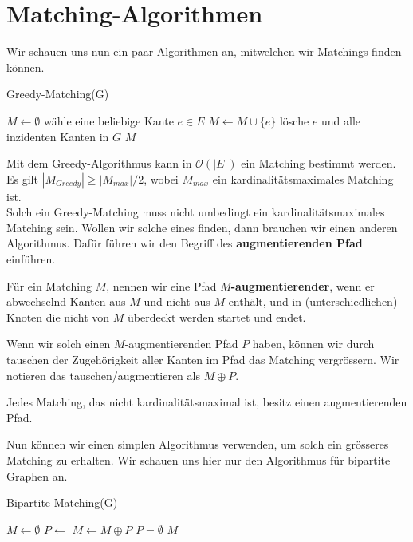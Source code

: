 \section{Matching-Algorithmen}

Wir schauen uns nun ein paar Algorithmen an, mitwelchen wir Matchings finden können.

\begin{algorithm}
    \caption{Greedy-Matching(G)}
    \begin{algorithmic}[1]
        \State $M \leftarrow \emptyset$
            \State wähle eine beliebige Kante $e \in E$
            \State $ M \leftarrow M \cup \{e\}$
            \State lösche $e$ und alle inzidenten Kanten in $G$
        \EndWhile
        \State \Return $M$
    \end{algorithmic}
\end{algorithm}

Mit dem Greedy-Algorithmus kann in $\mathcal{O}(|E|)$ ein Matching bestimmt werden. Es gilt
$|M_{Greedy}| \geq |M_{max}| / 2$, wobei $M_{max}$ ein kardinalitätsmaximales Matching ist. \\

Solch ein Greedy-Matching muss nicht umbedingt ein kardinalitätsmaximales Matching sein. Wollen wir solche eines finden, dann
brauchen wir einen anderen Algorithmus. Dafür führen wir den Begriff des \textbf{augmentierenden Pfad} einführen.
\begin{definition}
    Für ein Matching $M$, nennen wir eine Pfad \textbf{$M$-augmentierender}, wenn er abwechselnd Kanten
    aus $M$ und nicht aus $M$ enthält, und in (unterschiedlichen) Knoten die nicht von $M$ überdeckt werden startet und endet.
\end{definition}
\bigskip

Wenn wir solch einen $M$-augmentierenden Pfad $P$ haben, können wir durch tauschen der Zugehörigkeit aller Kanten im Pfad das Matching
vergrössern. Wir notieren das tauschen/augmentieren als $M \oplus P$.

\begin{satz}
    Jedes Matching, das nicht kardinalitätsmaximal ist, besitz einen augmentierenden Pfad.
\end{satz}
\bigskip

Nun können wir einen simplen Algorithmus verwenden, um solch ein grösseres Matching zu erhalten. Wir schauen
uns hier nur den Algorithmus für bipartite Graphen an.

\begin{algorithm}
    \caption{Bipartite-Matching(G)}
    \begin{algorithmic}[1]
        \State $M \leftarrow \emptyset$
        \Repeat
            \State $P \leftarrow$ 
            \State $M \leftarrow M \oplus P$
        \Until $P = \emptyset$
        \State \Return $M$
    \end{algorithmic}
\end{algorithm}

